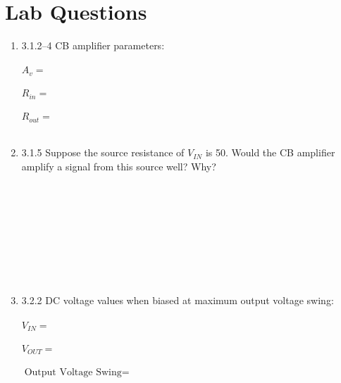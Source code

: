 \documentclass{article}
\begin{document}
\thispagestyle{plain}

\name

\section{Lab Questions}

\begin {enumerate}
	
	\item[3.1.2--4] CB amplifier parameters: \\~\\
    	$\boxed{A_{v}    = ~~~~~~~~~~~~~~~~~~~~~~~}$ \\ ~ \\
    	$\boxed{R_{in}   = ~~~~~~~~~~~~~~~~~~~~~~~}$ \\ ~ \\
    	$\boxed{R_{out}  = ~~~~~~~~~~~~~~~~~~~~~~~}$ \\ ~ \\
	\item[3.1.5] Suppose the source resistance of $V_{IN}$ is \unit{50}{\ohm}. Would the CB amplifier amplify a signal from this source well? Why?
	\\~\\~\\~\\~\\~\\~\\~\\~\\

	\item[3.2.2] DC voltage values when biased at maximum output voltage swing: \\~\\
    	$\boxed{V_{IN}   = ~~~~~~~~~~~~~~~~~~~~~~~}$ \\ ~ \\
    	$\boxed{V_{OUT}  = ~~~~~~~~~~~~~~~~~~~~~~~}$ \\ ~ \\
    	$\boxed{\text{Output Voltage Swing}	= ~~~~~~~~~~~~~~~~~~~~~~~}$ \\ ~ \\
    	

\end{enumerate}
\end{document}
